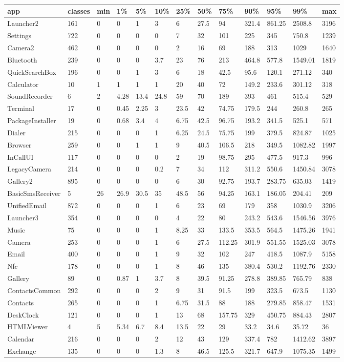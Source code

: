 \begin{tabular}{|l|l|l|l|l|l|l|l|l|l|l|l|l|}
\hline
app&classes&min&1\%&5\%&10\%&25\%&50\%&75\%&90\%&95\%&99\%&max\\
\hline
Launcher2&161&0&0&1&3&6&27.5&94&321.4&861.25&2508.8&3196\\
\hline
Settings&722&0&0&0&0&7&32&101&225&345&750.8&1239\\
\hline
Camera2&462&0&0&0&0&2&16&69&188&313&1029&1640\\
\hline
Bluetooth&239&0&0&0&3.7&23&76&213&464.8&577.8&1549.01&1819\\
\hline
QuickSearchBox&196&0&0&1&3&6&18&42.5&95.6&120.1&271.12&340\\
\hline
Calculator&10&1&1&1&1&20&40&72&149.2&233.6&301.12&318\\
\hline
SoundRecorder&6&2&4.28&13.4&24.8&59&70&189&393&461&515.4&529\\
\hline
Terminal&17&0&0.45&2.25&3&23.5&42&74.75&179.5&244&260.8&265\\
\hline
PackageInstaller&19&0&0.68&3.4&4&6.75&42.5&96.75&193.2&341.5&525.1&571\\
\hline
Dialer&215&0&0&0&1&6.25&24.5&75.75&199&379.5&824.87&1025\\
\hline
Browser&259&0&0&1&1&9&40.5&106.5&218&349.5&1082.82&1997\\
\hline
InCallUI&117&0&0&0&0&2&19&98.75&295&477.5&917.3&996\\
\hline
LegacyCamera&214&0&0&0&0.2&7&34&112&311.2&550.6&1450.84&3078\\
\hline
Gallery2&895&0&0&0&0&6&30&92.75&193.7&283.75&635.03&1419\\
\hline
BasicSmsReceiver&5&26&26.9&30.5&35&48.5&56&94.25&163.1&186.05&204.41&209\\
\hline
UnifiedEmail&872&0&0&0&1&6&23&69&179&358&1030.9&3206\\
\hline
Launcher3&354&0&0&0&0&4&22&80&243.2&543.6&1546.56&3976\\
\hline
Music&75&0&0&0&1&8.25&33&133.5&353.5&564.5&1475.26&1941\\
\hline
Camera&253&0&0&0&1&6&27.5&112.25&301.9&551.55&1525.03&3078\\
\hline
Email&400&0&0&0&1&9&32&102&247&418.5&1087.9&5158\\
\hline
Nfc&178&0&0&0&1&8&46&135&380.4&530.2&1192.76&2330\\
\hline
Gallery&89&0&0.87&1&3.7&8&39.5&91.25&278.8&389.85&765.79&838\\
\hline
ContactsCommon&292&0&0&0&2&9&31&91.5&199&323.5&673.5&1130\\
\hline
Contacts&265&0&0&0&1&6.75&31.5&88&188&279.85&858.47&1531\\
\hline
DeskClock&121&0&0&0&1&13&68&157.75&329&450.75&884.43&2807\\
\hline
HTMLViewer&4&5&5.34&6.7&8.4&13.5&22&29&33.2&34.6&35.72&36\\
\hline
Calendar&216&0&0&0&2&12&43&129&337.4&782&1412.62&3897\\
\hline
Exchange&135&0&0&0&1.3&8&46.5&125.5&321.7&647.9&1075.35&1499\\
\hline
\end{tabular}
